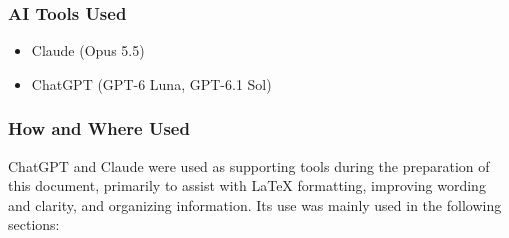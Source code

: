 \documentclass[12pt]{article}
\begin{document}
\subsubsection*{AI Tools Used}

\begin{itemize}
    \item Claude (Opus 5.5)
    \item ChatGPT (GPT-6 Luna, GPT-6.1 Sol)
\end{itemize}

\subsubsection*{How and Where Used}

ChatGPT and Claude were used as supporting tools during the preparation of
this document, primarily to assist with \LaTeX{} formatting,
improving wording and clarity, and organizing information.
Its use was mainly used in the following sections:
\end{document}
